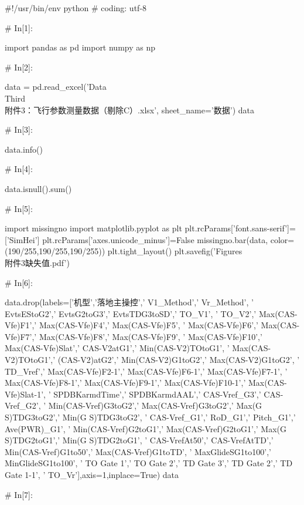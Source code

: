 \documentclass{MathorCupModeling}
\begin{document}
\begin{python}
#!/usr/bin/env python
# coding: utf-8

# In[1]:


import pandas as pd
import numpy as np


# In[2]:


data = pd.read_excel('Data\\Third\\附件3：飞行参数测量数据（剔除C）.xlsx', sheet_name='数据')
data


# In[3]:


data.info()


# In[4]:


data.isnull().sum()


# In[5]:


import missingno
import matplotlib.pyplot as plt
plt.rcParams['font.sans-serif']=['SimHei']
plt.rcParams['axes.unicode_minus']=False
missingno.bar(data, color=(190/255,190/255,190/255))
plt.tight_layout()
plt.savefig('Figures\\附件3缺失值.pdf')


# In[6]:


data.drop(labels=['机型','落地主操控',' V1_Method',' Vr_Method',
                  ' EvtsEStoG2',' EvtsG2toG3',' EvtsTDG3toSD',' TO_V1',
                  ' TO_V2',' Max(CAS-Vfe)F1',' Max(CAS-Vfe)F4',' Max(CAS-Vfe)F5',
                  ' Max(CAS-Vfe)F6',' Max(CAS-Vfe)F7',' Max(CAS-Vfe)F8',' Max(CAS-Vfe)F9',
                  ' Max(CAS-Vfe)F10',' Max(CAS-Vfe)Slat',' CAS-V2atG1',' Min(CAS-V2)TOtoG1',
                  ' Max(CAS-V2)TOtoG1',' (CAS-V2)atG2',' Min(CAS-V2)G1toG2',' Max(CAS-V2)G1toG2',
                  ' TD_Vref',' Max(CAS-Vfe)F2-1',' Max(CAS-Vfe)F6-1',' Max(CAS-Vfe)F7-1',
                  ' Max(CAS-Vfe)F8-1',' Max(CAS-Vfe)F9-1',' Max(CAS-Vfe)F10-1',' Max(CAS-Vfe)Slat-1',
                  ' SPDBKarmdTime',' SPDBKarmdAAL',' CAS-Vref_G3',' CAS-Vref_G2',
                  ' Min(CAS-Vref)G3toG2',' Max(CAS-Vref)G3toG2',' Max(G S)TDG3toG2',' Min(G S)TDG3toG2',
                  ' CAS-Vref_G1',' RoD_G1',' Pitch_G1',' Ave(PWR)_G1',
                  ' Min(CAS-Vref)G2toG1',' Max(CAS-Vref)G2toG1',' Max(G S)TDG2toG1',' Min(G S)TDG2toG1',
                  ' CAS-VrefAt50',' CAS-VrefAtTD',' Min(CAS-Vref)G1to50',' Max(CAS-Vref)G1toTD',
                  ' MaxGlideSG1to100',' MinGlideSG1to100',
                  ' TO Gate 1',' TO Gate 2',' TD Gate 3',' TD Gate 2',' TD Gate 1-1', ' TO_Vr'],axis=1,inplace=True)
data


# In[7]:



\end{python}
\end{document}
